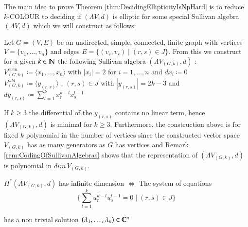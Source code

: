  The main idea to prove Theorem \ref{thm:DecidingEllipticityIsNpHard} is to reduce $k$-COLOUR to deciding if $(\Lambda V,d)$ is elliptic for some special 
 Sullivan algebra $(\Lambda V,d)$ which we will construct as follows: \\
 
 \begin{Construction}
 \label{constructionOfSullivanAlgebra}
 Let $G = (V,E)$ be an undirected, simple, connected, finite graph with vertices $ V = \lbrace v_1, \dotsc , v_n \rbrace $
 and edges $ E = \lbrace (v_r, v_s) \; | \; (r,s) \in J \rbrace$. From this we construct for a given $k \in \mathbb{N}$ the following
 Sullivan algebra $(\Lambda V_{(G,k)} , d)$ : \\
 
 $ V^{even}_{(G,k)} \coloneqq \langle x_1, \dotsc , x_n \rangle $ \; with \; $|x_i| = 2$ \; for \; $ i = 1, \dotsc , n$ \; 
 and \; $dx_i \coloneqq 0$ \\
 
 $V^{odd}_{(G,k)} \coloneqq \langle y_{(r,s)} \rangle$ , $(r,s) \in J$ \; with \; $|y_{(r,s)}| = 2k - 3$ \; and \; $dy_{(r,s)} \coloneqq 
 \sum_{l = 1}^k x_r^{k -l} x_s^{l - 1}$ \\
 
 \end{Construction}

\begin{Remark}
 If $k \geq 3$ the differential of the $y_{(r,s)}$ contains no linear term, hence
  $(\Lambda V_{(G,k)} ,d)$ is minimal for $k \geq 3$. Furthermore, the construction above
  is for fixed $k$ polynomial in the number of vertices since the constructed vector space
  $V_{(G,k)}$ has as many generators as $G$ has vertices and Remark \ref{rem:CodingOfSullivanAlgebras}
  shows that the representation of $(\Lambda V_{(G,k)} ,d)$ is polynomial in $dim \, V_{(G,k)}$.

  
\end{Remark}


%  

\begin{Lemma}
\label{lma:cohomoly+equations}
 $H^*(\Lambda V_{(G,k)}, d)$ has infinite dimension $\iff$ The system of equations \\
 \begin{equation}
 \label{systemofequations}
 {\lbrace \sum_{l = 1}^k u_r^{k - l} u_s^{l - 1} = 0 \; | \; (r,s) \in J \rbrace}  
 \end{equation}
 
 has a non trivial solution 
 $(\lambda_1 , \dotsc, \lambda_n) \in \mathbb{C}^n$
\end{Lemma}

